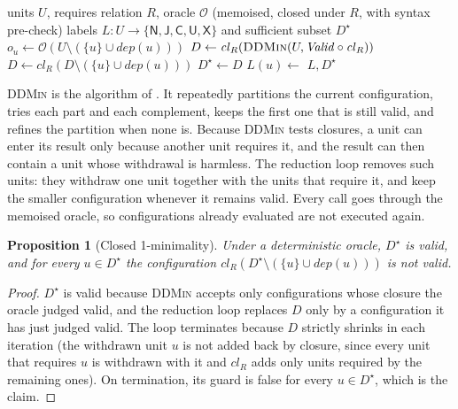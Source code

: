 \documentclass[a4paper,fleqn]{cas-sc}
\newcommand{\lab}[1]{\textsf{#1}}
\newtheorem{proposition}{Proposition}
\begin{document}
\begin{algorithm}[t]
\caption{Counterfactual triage (C3)}\label{alg:triage}
\begin{algorithmic}[1]
\Require units $U$, requires relation $R$, oracle $\mathcal{O}$ (memoised, closed under $R$, with syntax pre-check)
\Ensure labels $L: U\to\{\lab{N},\lab{J},\lab{C},\lab{U},\lab{X}\}$ and sufficient subset $D^\star$
\If{$\neg\mathit{Valid}(U)$ \textbf{or} \Call{Rerun}{$U$} $\neq\lab{valid}$ \textbf{or} $\mathit{Valid}(\emptyset)$} \State \Return {} \EndIf
{}
  \State $o_u \gets \mathcal{O}(U\setminus(\{u\}\cup\mathit{dep}(u)))$ 
\EndFor
\State $D \gets \mathit{cl}_R(\Call{DDMin}{U, \mathit{Valid}\circ\mathit{cl}_R})$ 
  \State $D \gets \mathit{cl}_R(D\setminus(\{u\}\cup\mathit{dep}(u)))$ 
\EndWhile
\State $D^\star\gets D$
 \State $L(u)\gets$   \EndFor
\State \Return $L, D^\star$
\end{algorithmic}
\end{algorithm}

\textsc{DDMin} is the algorithm of \citet{zeller2002ddmin}. It repeatedly partitions the current configuration, tries each part and each complement, keeps the first one that is still valid, and refines the partition when none is. Because \textsc{DDMin} tests closures, a unit can enter its result only because another unit requires it, and the result can then contain a unit whose withdrawal is harmless. The reduction loop removes such units: they withdraw one unit together with the units that require it, and keep the smaller configuration whenever it remains valid. Every call goes through the memoised oracle, so configurations already evaluated are not executed again.

\begin{proposition}[Closed 1-minimality]\label{prop:min}
Under a deterministic oracle, $D^\star$ is valid, and for every $u\in D^\star$ the configuration $\mathit{cl}_R(D^\star\setminus(\{u\}\cup\mathit{dep}(u)))$ is not valid.
\end{proposition}
\begin{proof}
$D^\star$ is valid because \textsc{DDMin} accepts only configurations whose closure the oracle judged valid, and the reduction loop replaces $D$ only by a configuration it has just judged valid. The loop terminates because $D$ strictly shrinks in each iteration (the withdrawn unit $u$ is not added back by closure, since every unit that requires $u$ is withdrawn with it and $\mathit{cl}_R$ adds only units required by the remaining ones). On termination, its guard is false for every $u\in D^\star$, which is the claim.
\end{proof}
\end{document}
